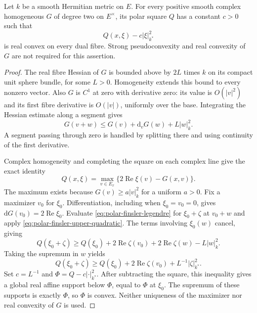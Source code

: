 \begin{lemma}\label{lem:polar-finsler-uniform-strong-convexity}
Let $k$ be a smooth Hermitian metric on $E$. For every positive smooth complex homogeneous $G$ of degree two on $E^\times$, its polar square $Q$ has a constant $c>0$ such that
\[
 Q(x,\xi)-c|\xi|_{k^*}^2
\]
is real convex on every dual fibre. Strong pseudoconvexity and real convexity of $G$ are not required for this assertion.
\end{lemma}
\begin{proof}
The real fibre Hessian of $G$ is bounded above by $2L$ times $k$ on its compact unit sphere bundle, for some $L>0$. Homogeneity extends this bound to every nonzero vector. Also $G$ is $C^1$ at zero with derivative zero: its value is $O(|v|^2)$ and its first fibre derivative is $O(|v|)$, uniformly over the base. Integrating the Hessian estimate along a segment gives
\begin{equation}\label{eq:polar-finsler-upper-quadratic}
 G(v+w)\leq G(v)+\mathrm d_vG(w)+L|w|_k^2.
\end{equation}
A segment passing through zero is handled by splitting there and using continuity of the first derivative.

Complex homogeneity and completing the square on each complex line give the exact identity
\begin{equation}\label{eq:polar-finsler-legendre}
 Q(x,\xi)=\max_{v\in E_x}
                  \{2\operatorname{Re}\xi(v)-G(x,v)\}.
\end{equation}
The maximum exists because $G(v)\geq a|v|_k^2$ for a uniform $a>0$. Fix a maximizer $v_0$ for $\xi_0$. Differentiation, including when $\xi_0=v_0=0$, gives $\mathrm dG(v_0)=2\operatorname{Re}\xi_0$. Evaluate \eqref{eq:polar-finsler-legendre} for $\xi_0+\zeta$ at $v_0+w$ and apply \eqref{eq:polar-finsler-upper-quadratic}. The terms involving $\xi_0(w)$ cancel, giving
\[
 Q(\xi_0+\zeta)\geq Q(\xi_0)+2\operatorname{Re}\zeta(v_0)
                 +2\operatorname{Re}\zeta(w)-L|w|_k^2.
\]
Taking the supremum in $w$ yields
\[
 Q(\xi_0+\zeta)\geq Q(\xi_0)+2\operatorname{Re}\zeta(v_0)
                         +L^{-1}|\zeta|_{k^*}^2.
\]
Set $c=L^{-1}$ and $\Phi=Q-c|\cdot|_{k^*}^2$. After subtracting the square, this inequality gives a global real affine support below $\Phi$, equal to $\Phi$ at $\xi_0$. The supremum of these supports is exactly $\Phi$, so $\Phi$ is convex. Neither uniqueness of the maximizer nor real convexity of $G$ is used.
\end{proof}

